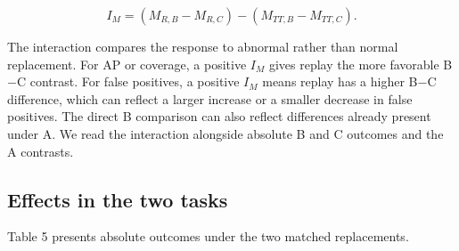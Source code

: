 \documentclass[pdflatex,sn-apa]{sn-jnl}
\begin{document}
\[
I_M=(M_{R,B}-M_{R,C})-(M_{TT,B}-M_{TT,C}).
\]

The interaction compares the response to abnormal rather than normal
replacement. For AP or coverage, a positive \(I_M\) gives replay the
more favorable B\ensuremath{-}C contrast. For false positives, a positive \(I_M\)
means replay has a higher B\ensuremath{-}C difference, which can reflect a larger
increase or a smaller decrease in false positives. The direct B
comparison can also reflect differences already present under A. We read
the interaction alongside absolute B and C outcomes and the A contrasts.

\subsection{Effects in the two tasks}\label{effects-in-the-two-tasks}

Table 5 presents absolute outcomes under the two matched replacements.
\end{document}
